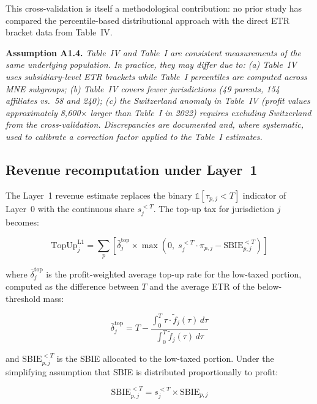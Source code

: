 \documentclass[11pt,a4paper]{article}
\newcommand{\assumption}[2]{\noindent\textbf{Assumption #1.} \textit{#2}\medskip}
\begin{document}
This cross-validation is itself a methodological contribution: no prior study has compared the percentile-based distributional approach with the direct ETR bracket data from Table~IV.

\assumption{A1.4}{Table~IV and Table~I are consistent measurements of the same underlying population. In practice, they may differ due to: (a) Table~IV uses subsidiary-level ETR brackets while Table~I percentiles are computed across MNE subgroups; (b) Table~IV covers fewer jurisdictions (49 parents, 154 affiliates vs.\ 58 and 240); (c) the Switzerland anomaly in Table~IV (profit values approximately 8,600$\times$ larger than Table~I in 2022) requires excluding Switzerland from the cross-validation. Discrepancies are documented and, where systematic, used to calibrate a correction factor applied to the Table~I estimates.}

\subsection{Revenue recomputation under Layer~1}\label{sec:layer1_revenue}

The Layer~1 revenue estimate replaces the binary $\mathbb{1}[\tau_{p,j} < T]$ indicator of Layer~0 with the continuous share $s_j^{<T}$. The top-up tax for jurisdiction $j$ becomes:

\begin{equation}\label{eq:topup_layer1}
\text{TopUp}_j^{\text{L1}} = \sum_p \left[\bar{\delta}_j^{\text{top}} \times \max\!\left(0,\; s_j^{<T} \cdot \pi_{p,j} - \text{SBIE}_{p,j}^{<T}\right)\right]
\end{equation}

where $\bar{\delta}_j^{\text{top}}$ is the profit-weighted average top-up rate for the low-taxed portion, computed as the difference between $T$ and the average ETR of the below-threshold mass:

\begin{equation}\label{eq:avg_topup_rate}
\bar{\delta}_j^{\text{top}} = T - \frac{\int_0^{T} \tau \cdot \tilde{f}_j(\tau) \, d\tau}{\int_0^{T} \tilde{f}_j(\tau) \, d\tau}
\end{equation}

and $\text{SBIE}_{p,j}^{<T}$ is the SBIE allocated to the low-taxed portion. Under the simplifying assumption that SBIE is distributed proportionally to profit:

\begin{equation}\label{eq:sbie_lowtax}
\text{SBIE}_{p,j}^{<T} = s_j^{<T} \times \text{SBIE}_{p,j}
\end{equation}
\end{document}
